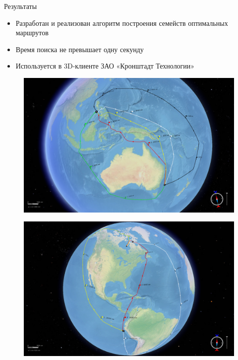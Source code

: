 \documentclass[russian, hyperref={unicode}]{beamer}
\begin{document}
\begin{frame}{Результаты}
     {
        \begin{itemize}
            \item Разработан и реализован алгоритм построения семейств оптимальных маршрутов 
            \item Время поиска не превышает одну секунду
            \item Используется в 3D-клиенте ЗАО «Кронштадт Технологии»
        \end{itemize}
    }
     {
        \begin{figure}
            \includegraphics[width=\textwidth]{Results/1}
        \end{figure}
    }

     {
        \begin{figure}
            \includegraphics[width=\textwidth]{Results/2}
        \end{figure}
    }


\end{frame}
\end{document}
